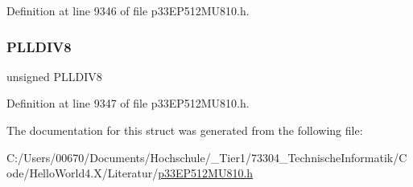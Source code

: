 Definition at line 9346 of file p33\+E\+P512\+M\+U810.\+h.

\mbox{\label{structtag_p_l_l_f_b_d_b_i_t_s_a33daf8ffbd157112afbf1493704cdacc}} 
\subsubsection{\texorpdfstring{P\+L\+L\+D\+I\+V8}{PLLDIV8}}
{\footnotesize\ttfamily unsigned P\+L\+L\+D\+I\+V8}



Definition at line 9347 of file p33\+E\+P512\+M\+U810.\+h.



The documentation for this struct was generated from the following file\+:\begin{DoxyCompactItemize}
\item 
C\+:/\+Users/00670/\+Documents/\+Hochschule/\+\_\+\+Tier1/73304\+\_\+\+Technische\+Informatik/\+Code/\+Hello\+World4.\+X/\+Literatur/\hyperlink{p33_e_p512_m_u810_8h}{p33\+E\+P512\+M\+U810.\+h}\end{DoxyCompactItemize}
